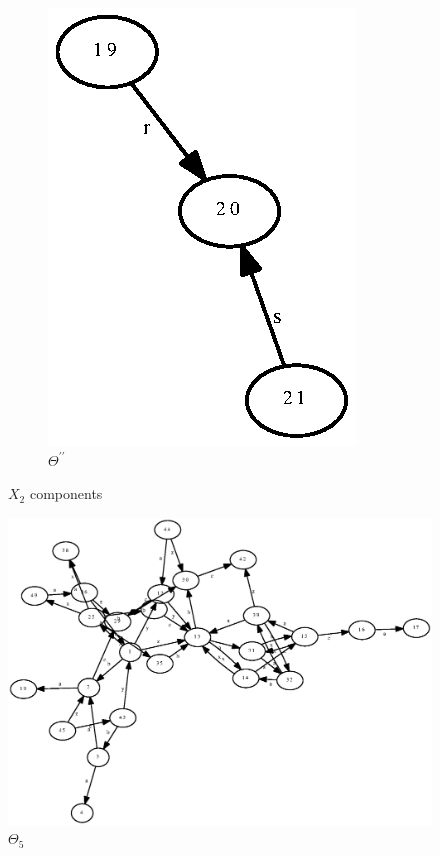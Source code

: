 \documentclass[a4paper,12pt]{article}
\numberwithin{equation}{section}
\numberwithin{figure}{section}
\begin{document}
\begin{figure}
\begin{center}
\begin{subfigure}[b]{.3\columnwidth}
\includegraphics[scale=0.5, angle=90, bb=0 0 82 210]{python/ex_K_Y2.eps}
\caption{$\Theta^{\prime\prime}$}
\label{fig:KY2}
\end{subfigure}
\end{center}
\caption{$X_2$ components}
\label{fig:KY}
\end{figure}
\begin{figure}
\begin{center}
\includegraphics[scale=0.7,bb=0 0 820 720]{python/ex_K_f5.eps}
\caption{$\Theta_5$}
\label{fig:KX5}
\end{center}
\end{figure}
\end{document}
